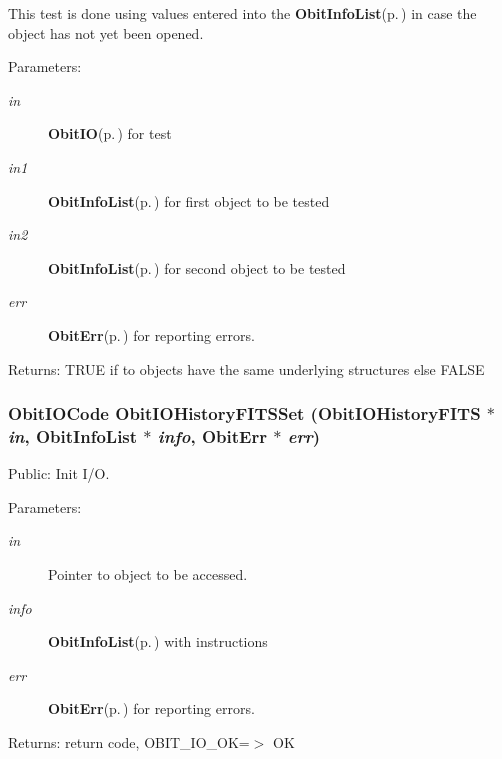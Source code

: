This test is done using values entered into the {\bf Obit\-Info\-List}{\rm (p.\,\pageref{structObitInfoList})} in case the object has not yet been opened. \begin{Desc}
\item[Parameters:]
\begin{description}
\item[{\em in}]{\bf Obit\-IO}{\rm (p.\,\pageref{structObitIO})} for test \item[{\em in1}]{\bf Obit\-Info\-List}{\rm (p.\,\pageref{structObitInfoList})} for first object to be tested \item[{\em in2}]{\bf Obit\-Info\-List}{\rm (p.\,\pageref{structObitInfoList})} for second object to be tested \item[{\em err}]{\bf Obit\-Err}{\rm (p.\,\pageref{structObitErr})} for reporting errors. \end{description}
\end{Desc}
\begin{Desc}
\item[Returns:]TRUE if to objects have the same underlying structures else FALSE \end{Desc}
\subsubsection{\setlength{\rightskip}{0pt plus 5cm}Obit\-IOCode Obit\-IOHistory\-FITSSet ({\bf Obit\-IOHistory\-FITS} $\ast$ {\em in}, {\bf Obit\-Info\-List} $\ast$ {\em info}, {\bf Obit\-Err} $\ast$ {\em err})}\label{ObitIOHistoryFITS_8c_a14}


Public: Init I/O. 

\begin{Desc}
\item[Parameters:]
\begin{description}
\item[{\em in}]Pointer to object to be accessed. \item[{\em info}]{\bf Obit\-Info\-List}{\rm (p.\,\pageref{structObitInfoList})} with instructions \item[{\em err}]{\bf Obit\-Err}{\rm (p.\,\pageref{structObitErr})} for reporting errors. \end{description}
\end{Desc}
\begin{Desc}
\item[Returns:]return code, OBIT\_\-IO\_\-OK=$>$ OK \end{Desc}
